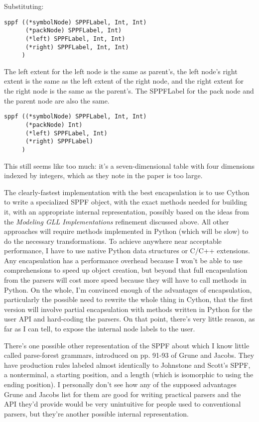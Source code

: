 \documentclass[12pt]{article}
\begin{document}
Substituting:

\begin{verbatim}
sppf ((*symbolNode) SPPFLabel, Int, Int)
      (*packNode) SPPFLabel, Int)
      (*left) SPPFLabel, Int, Int)
      (*right) SPPFLabel, Int, Int)
     )
\end{verbatim}

The left extent for the left node is the same as parent's, the left
node's right extent is the same as the left extent of the right node,
and the right extent for the right node is the same as the parent's.
The SPPFLabel for the pack node and the parent node are also the same.

\begin{verbatim}
sppf ((*symbolNode) SPPFLabel, Int, Int)
      (*packNode) Int)
      (*left) SPPFLabel, Int)
      (*right) SPPFLabel)
     )
\end{verbatim}

This still seems like too much: it's a seven-dimensional table with
four dimensions indexed by integers, which as they note in the paper
is too large.

The clearly-fastest implementation with the best encapsulation is to
use Cython to write a specialized SPPF object, with the exact methods
needed for building it, with an appropriate internal representation,
possibly based on the ideas from the \emph{Modeling GLL
  Implementations} refinement discussed above.  All other approaches
will require methods implemented in Python (which will be slow) to do
the necessary transformations.  To achieve anywhere near acceptable
performance, I have to use native Python data structures or C/C++
extensions.  Any encapsulation has a performance overhead because I
won't be able to use comprehensions to speed up object creation, but
beyond that full encapsulation from the parsers will cost more speed
because they will have to call methods in Python.  On the whole, I'm
convinced enough of the advantages of encapsulation, particularly the
possible need to rewrite the whole thing in Cython, that the first
version will involve partial encapsulation with methods written in
Python for the user API and hard-coding the parsers.  On that point,
there's very little reason, as far as I can tell, to expose the
internal node labels to the user.

There's one possible other representation of the SPPF about which I
know little called parse-forest grammars, introduced on pp. 91-93 of
Grune and Jacobs.  They have production rules labeled almost
identically to Johnstone and Scott's SPPF, a nonterminal, a starting
position, and a length (which is isomorphic to using the ending
position).  I personally don't see how any of the supposed advantages
Grune and Jacobs list for them are good for writing practical parsers
and the API they'd provide would be very unintuitive for people used
to conventional parsers, but they're another possible internal
representation.
\end{document}
